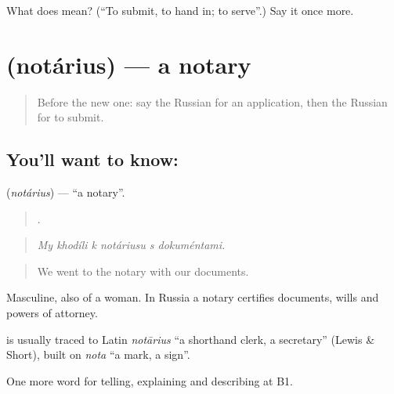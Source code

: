 \begin{tcolorbox}[breakable,colback=teal!4,colframe=teal!35!black,title={Before you move on}]
What does  mean? (\textquotedblleft{}To submit, to hand in; to serve\textquotedblright{}.) Say it once more.
\end{tcolorbox}
\section[\texorpdfstring{\ru{нотариус} (notárius)}{нотариус (notárius)}]{ (notárius) — a notary}

\label{lesson:RU-C393-notarius}



\begin{quote}
Before the new one: say the Russian for an application, then the Russian for to submit.
\end{quote}

\subsection*{You'll want to know: }
\textbf{} (\emph{notárius}) — \textquotedblleft{}a notary\textquotedblright{}.

\begin{quote}
     .
\end{quote}

\begin{quote}
\emph{My khodíli k notáriusu s dokuméntami.}
\end{quote}

\begin{quote}
We went to the notary with our documents.
\end{quote}

Masculine, also of a woman. In Russia a notary certifies documents, wills and powers of attorney.

\begin{cousinweb}
\textbf{} is usually traced to Latin \emph{notārius} \textquotedblleft{}a shorthand clerk, a secretary\textquotedblright{} (Lewis \& Short), built on \emph{nota} \textquotedblleft{}a mark, a sign\textquotedblright{}.
\end{cousinweb}

\begin{grammarlens}[title={What you've built}]
One more word for telling, explaining and describing at B1.
\end{grammarlens}

